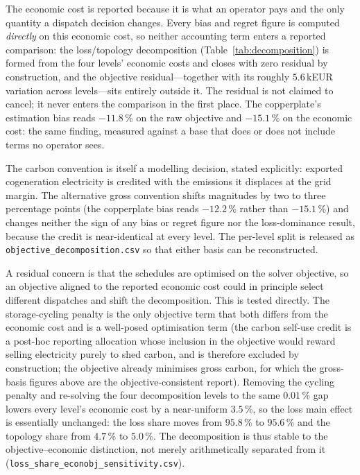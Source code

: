 The economic cost is reported because it is what an operator pays and the only quantity a
dispatch decision changes. Every bias and regret figure is computed \emph{directly} on this
economic cost, so neither accounting term enters a reported comparison: the loss/topology
decomposition (Table~\ref{tab:decomposition}) is formed from the four levels' economic costs and
closes with zero residual by construction, and the objective residual---together with its
roughly $5.6$\,kEUR variation across levels---sits entirely outside it. The residual is not
claimed to cancel; it never enters the comparison in the first place. The copperplate's
estimation bias reads $-11.8$\,\% on the raw objective and $\mathbf{-15.1}$\,\% on the
economic cost: the same finding, measured against a base that does or does not include
terms no operator sees.

The carbon convention is itself a modelling decision, stated explicitly: exported
cogeneration electricity is credited with the emissions it displaces at the grid margin.
The alternative gross convention shifts magnitudes by two to three percentage points
(the copperplate bias reads $-12.2$\,\% rather than $-15.1$\,\%) and changes neither the
sign of any bias or regret figure nor the loss-dominance result, because the credit is
near-identical at every level. The per-level split is released as
\texttt{objective\_decomposition.csv} so that either basis can be reconstructed.

A residual concern is that the schedules are optimised on the solver objective, so an
objective aligned to the reported economic cost could in principle select different
dispatches and shift the decomposition. This is tested directly. The storage-cycling
penalty is the only objective term that both differs from the economic cost and is a
well-posed optimisation term (the carbon self-use credit is a post-hoc reporting
allocation whose inclusion in the objective would reward selling electricity purely to
shed carbon, and is therefore excluded by construction; the objective already minimises
gross carbon, for which the gross-basis figures above are the objective-consistent
report). Removing the cycling penalty and re-solving the four decomposition levels to the
same $0.01$\,\% gap lowers every level's economic cost by a near-uniform $3.5$\,\%, so the
loss main effect is essentially unchanged: the loss share moves from $95.8$\,\% to
$95.6$\,\% and the topology share from $4.7$\,\% to $5.0$\,\%. The decomposition is thus
stable to the objective--economic distinction, not merely arithmetically separated from
it (\texttt{loss\_share\_econobj\_sensitivity.csv}).
